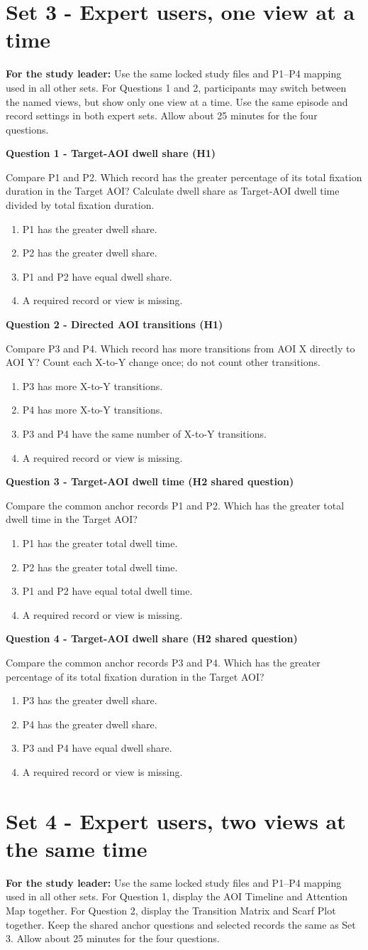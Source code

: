 \documentclass[11pt]{article}
\newcommand{\choices}[5]{\begin{enumerate}[label=\Alph*.,leftmargin=2em,itemsep=0.15em,topsep=0.2em]\item #2\item #3\item #4\item #5\end{enumerate}}
\newcommand{\tasktitle}[1]{\vspace{0.4em}\noindent\textbf{#1}\par}
\begin{document}
\clearpage
\section*{Set 3 - Expert users, one view at a time}
\textbf{For the study leader:} Use the same locked study files and P1--P4
mapping used in all other sets. For Questions 1 and 2, participants may switch
between the named views, but show only one view at a time. Use the same episode
and record settings in both expert sets. Allow about 25 minutes for the four
questions.

\tasktitle{Question 1 - Target-AOI dwell share (H1)}
Compare P1 and P2. Which record has the greater percentage of its total
fixation duration in the Target AOI? Calculate dwell share as Target-AOI dwell
time divided by total fixation duration.
\choices{}{P1 has the greater dwell share.}{P2 has the greater dwell share.}{P1 and P2 have equal dwell share.}{A required record or view is missing.}

\tasktitle{Question 2 - Directed AOI transitions (H1)}
Compare P3 and P4. Which record has more transitions from AOI X directly to
AOI Y? Count each X-to-Y change once; do not count other transitions.
\choices{}{P3 has more X-to-Y transitions.}{P4 has more X-to-Y transitions.}{P3 and P4 have the same number of X-to-Y transitions.}{A required record or view is missing.}

\tasktitle{Question 3 - Target-AOI dwell time (H2 shared question)}
Compare the common anchor records P1 and P2. Which has the greater total dwell
time in the Target AOI?
\choices{}{P1 has the greater total dwell time.}{P2 has the greater total dwell time.}{P1 and P2 have equal total dwell time.}{A required record or view is missing.}

\tasktitle{Question 4 - Target-AOI dwell share (H2 shared question)}
Compare the common anchor records P3 and P4. Which has the greater percentage
of its total fixation duration in the Target AOI?
\choices{}{P3 has the greater dwell share.}{P4 has the greater dwell share.}{P3 and P4 have equal dwell share.}{A required record or view is missing.}

\clearpage
\section*{Set 4 - Expert users, two views at the same time}
\textbf{For the study leader:} Use the same locked study files and P1--P4
mapping used in all other sets. For Question 1, display the AOI Timeline and Attention Map together.
For Question 2, display the Transition Matrix and Scarf Plot together. Keep the
shared anchor questions and selected records the same as Set 3. Allow about 25
minutes for the four questions.
\end{document}
